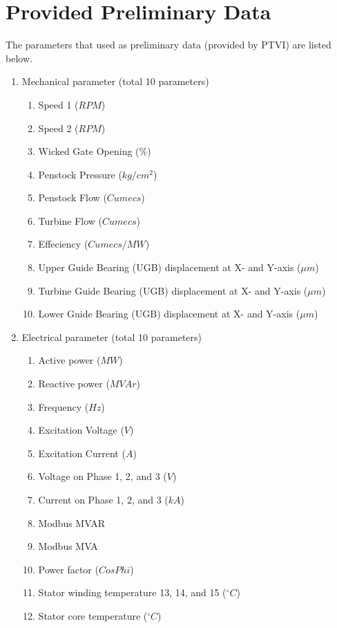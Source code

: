 \documentclass[11pt,a4paper,twoside,onecolumn]{book}
\begin{document}
	\section{Provided Preliminary Data}
	The parameters that used as preliminary data (provided by PTVI) are listed below.
		\begin{enumerate}
			\item Mechanical parameter (total 10 parameters)
			\begin{enumerate}
				\item Speed 1 (\(RPM\))
				\item Speed 2 (\(RPM\))
				\item Wicked Gate Opening (\(\%\))
				\item Penstock Pressure (\(kg/cm^2\))
				\item Penstock Flow (\(Cumecs\))
				\item Turbine Flow (\(Cumecs\))
				\item Effeciency (\(Cumecs/MW\))
				\item Upper Guide Bearing (UGB) displacement at X- and Y-axis (\(\mu m\))
				\item Turbine Guide Bearing (UGB) displacement at X- and Y-axis (\(\mu m\))
				\item Lower Guide Bearing (UGB) displacement at X- and Y-axis (\(\mu m\)) 
			\end{enumerate}
			
			\item Electrical parameter (total 10 parameters)
			\begin{enumerate}
				\item Active power (\(MW\))
				\item Reactive power (\(MVAr\))
				\item Frequency (\(Hz\))
				\item Excitation Voltage (\(V\))
				\item Excitation Current (\(A\))
				\item Voltage on Phase 1, 2, and 3 (\(V\))
				\item Current on Phase 1, 2, and 3 (\(kA\))
				\item Modbus MVAR
				\item Modbus MVA
				\item Power factor (\(Cos Phi\))
				\item Stator winding temperature 13, 14, and 15 (\(^{\circ} C\))
				\item Stator core temperature (\(^{\circ} C\))
			\end{enumerate}
			

\end{enumerate}
\end{document}
